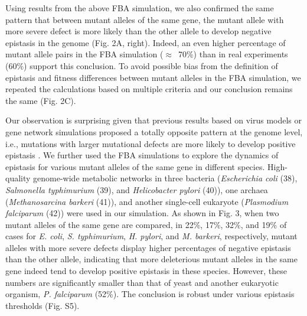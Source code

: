 Using results from the above FBA simulation, we also confirmed the
same pattern that between mutant alleles of the same gene, the mutant
allele with more severe defect is more likely than the other allele to
develop negative epistasis in the genome (Fig. 2A, right). Indeed, an
even higher percentage of mutant allele pairs in the FBA simulation
($\approx$~70\%) than in real experiments (60\%) support this
conclusion. To avoid possible bias from the definition of epistasis
and fitness differences between mutant alleles in the FBA simulation,
we repeated the calculations based on multiple criteria and our
conclusion remains the same (Fig. 2C).

Our observation is surprising given that previous results based on
virus models or gene network simulations proposed a totally opposite
pattern at the genome level, i.e., mutations with larger mutational
defects are more likely to develop positive epistasis \citep{Burch2004, 
You2002, Sanjuan2006a, Azevedo2006, Lohaus2010}. We
further used the FBA simulations to explore the dynamics of epistasis
for various mutant alleles of the same gene in different
species. High-quality genome-wide metabolic networks in three bacteria
(\textit{Escherichia coli} (38), \textit{Salmonella typhimurium} (39),
and \textit{Helicobacter pylori} (40)), one archaea
(\textit{Methanosarcina barkeri} (41)), and another single-cell
eukaryote (\textit{Plasmodium falciparum} (42)) were used in our
simulation. As shown in Fig. 3, when two mutant alleles of the same
gene are compared, in 22\%, 17\%, 32\%, and 19\% of cases for
\textit{E. coli}, \textit{S. typhimurium}, \textit{H. pylori}, and
\textit{M. barkeri}, respectively, mutant
alleles with more severe defects display higher percentages of
negative epistasis than the other allele, indicating that more
deleterious mutant alleles in the same gene indeed tend to develop
positive epistasis in these species. However, these numbers are
significantly smaller than that of yeast and another eukaryotic
organism, \textit{P. falciparum} (52\%). The conclusion is robust
under various epistasis thresholds (Fig. S5).

